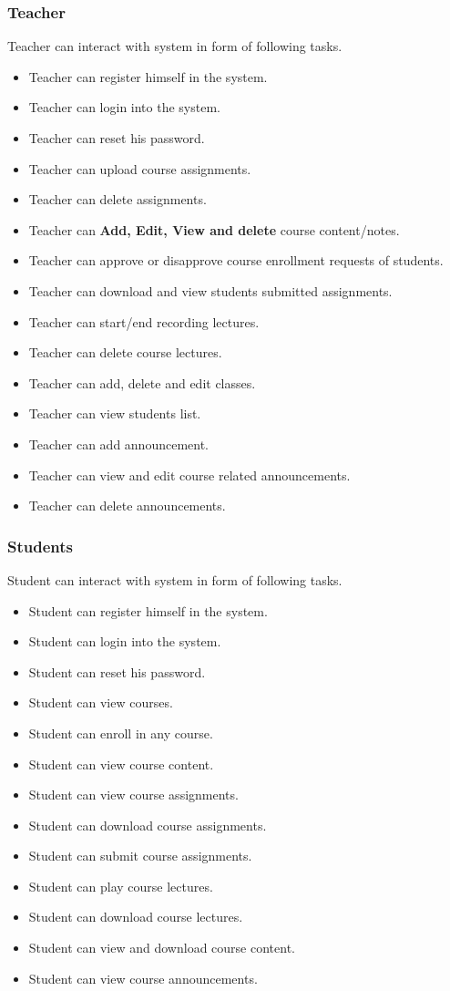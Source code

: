 \subsubsection{Teacher}
Teacher can interact with system in form of following tasks.
\begin{itemize}
\item Teacher can register himself in the system.
\item Teacher can login into the system.
\item Teacher can reset his password.
\item Teacher can upload course assignments.
\item Teacher can delete assignments.
\item Teacher can \textbf{Add, Edit, View and delete} course content/notes.
\item Teacher can approve or disapprove course enrollment requests of students.
\item Teacher can download and view students submitted assignments.
\item Teacher can start/end recording lectures.
\item Teacher can delete course lectures.
\item Teacher can add, delete and edit classes.
\item Teacher can view students list.
\item Teacher can add announcement.
\item Teacher can view and edit course related announcements.
\item Teacher can delete announcements.
\end{itemize}
\bigskip

\subsubsection{Students}
Student can interact with system in form of following tasks.
\begin{itemize}
\item Student can register himself in the system.
\item Student can login into the system.
\item Student can reset his password.
\item Student can view courses.
\item Student can enroll in any course.
\item Student can view course content.
\item Student can view course assignments.
\item Student can download course assignments.
\item Student can submit course assignments.
\item Student can play course lectures.
\item Student can download course lectures.
\item Student can view and download course content.
\item Student can view course announcements.
\end{itemize}
\bigskip

